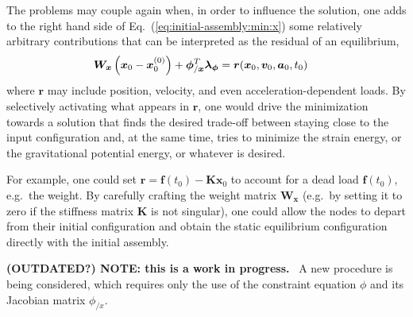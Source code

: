 \documentclass[10pt,dvips,fleqn,subeqn]{report}
\newcommand{\T}[1]{\bm{#1}}
\newcommand{\TT}[1]{\bm{#1}}
\begin{document}
The problems may couple again when, in order to influence the solution,
one adds to the right hand side of Eq.~(\ref{eq:initial-assembly:min:x})
some relatively arbitrary contributions that can be interpreted
as the residual of an equilibrium,
\begin{align}
	\TT{W}_{\T{x}} \plbr{\T{x}_0 - \T{x}_0^{(0)}}
	+
	\T{\phi}_{/\T{x}}^T \T{\lambda}_{\T{\phi}}
	&=
	\T{r}(\T{x}_0, \T{v}_0, \T{a}_0, t_0)
\end{align}
where $\T{r}$ may include position, velocity, and even acceleration-dependent loads.
By selectively activating what appears in $\T{r}$, one would drive the minimization
towards a solution that finds the desired trade-off between staying close
to the input configuration and, at the same time, tries to minimize the strain energy,
or the gravitational potential energy, or whatever is desired.

For example, one could set $\T{r} = \T{f}(t_0) - \TT{K} \T{x}_0$
to account for a dead load $\T{f}(t_0)$, e.g.\ the weight.
By carefully crafting the weight matrix $\TT{W}_{\T{x}}$
(e.g.\ by setting it to zero if the stiffness matrix $\TT{K}$ is not singular),
one could allow the nodes to depart from their initial configuration
and obtain the static equilibrium configuration directly with the initial assembly.



\bigskip



\textbf{(OUTDATED?) NOTE: this is a work in progress.} \
A new procedure is being considered, which requires only the use 
of the constraint equation $\phi$ and its Jacobian matrix $\phi_{/x}$.
\end{document}

